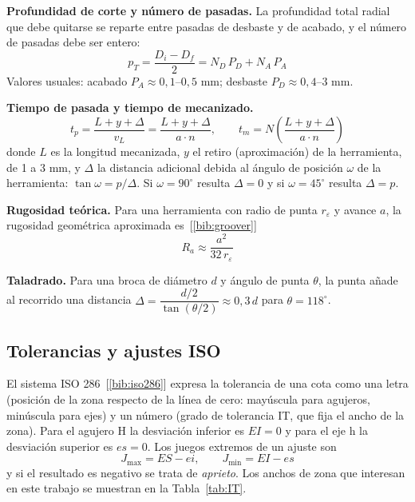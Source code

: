 \documentclass[12pt,a4paper]{article}
\newcommand{\refbib}[1]{[\ref{#1}]}
\begin{document}
\textbf{Profundidad de corte y número de pasadas.} La profundidad total radial
que debe quitarse se reparte entre pasadas de desbaste y de acabado, y el número
de pasadas debe ser entero:
\begin{equation}\label{eq:pT}
	p_T=\frac{D_i-D_f}{2}=N_D\,P_D+N_A\,P_A
\end{equation}
Valores usuales: acabado $P_A\approx 0{,}1$--$0{,}5$ mm; desbaste $P_D\approx
	0{,}4$--$3$ mm.

\textbf{Tiempo de pasada y tiempo de mecanizado.}
\begin{equation}\label{eq:tp}
	t_p=\frac{L+y+\Delta}{v_L}=\frac{L+y+\Delta}{a\cdot n},
	\qquad t_m = N\left(\frac{L+y+\Delta}{a\cdot n}\right)
\end{equation}
donde $L$ es la longitud mecanizada, $y$ el retiro (aproximación) de la
herramienta, de 1 a 3 mm, y $\Delta$ la distancia adicional debida al ángulo de
posición $\omega$ de la herramienta: $\tan\omega = p/\Delta$. Si $\omega=90^\circ$
resulta $\Delta=0$ y si $\omega=45^\circ$ resulta $\Delta=p$.

\textbf{Rugosidad teórica.} Para una herramienta con radio de punta $r_\varepsilon$
y avance $a$, la rugosidad geométrica aproximada es~\refbib{bib:groover}
\begin{equation}\label{eq:Ra}
	R_a \approx \frac{a^2}{32\, r_\varepsilon}
\end{equation}

\textbf{Taladrado.} Para una broca de diámetro $d$ y ángulo de punta $\theta$, la
punta añade al recorrido una distancia
$\Delta = \dfrac{d/2}{\tan(\theta/2)}\approx 0{,}3\,d$ para $\theta=118^\circ$.

\subsection{Tolerancias y ajustes ISO}

El sistema ISO 286~\refbib{bib:iso286} expresa la tolerancia de una cota como
una letra (posición de la zona respecto de la línea de cero: mayúscula para
agujeros, minúscula para ejes) y un número (grado de tolerancia IT, que fija el
ancho de la zona). Para el agujero H la desviación inferior es $EI=0$ y para el
eje h la desviación superior es $es=0$. Los juegos extremos de un ajuste son
\begin{equation}\label{eq:juego}
	J_{\max}=ES-ei,\qquad J_{\min}=EI-es
\end{equation}
y si el resultado es negativo se trata de \emph{aprieto}. Los anchos de zona que
interesan en este trabajo se muestran en la Tabla~\ref{tab:IT}.
\end{document}
